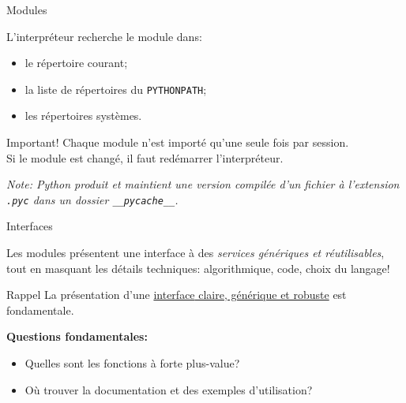 \documentclass[dvipsnames]{beamer}
\begin{document}
\begin{frame}
    [fragile]{Modules}

    L'interpréteur recherche le module dans:
    \begin{itemize}
        \item le répertoire courant;
        \item la liste de répertoires du \texttt{PYTHONPATH};
        \item les répertoires systèmes.
    \end{itemize}

    \begin{alertblock}
        {Important!}
        Chaque module n'est importé \alert{qu'une seule fois} par session.\\Si
        le module est changé, il faut redémarrer l'interpréteur.
    \end{alertblock}

    \vspace{-.5em} {\em Note: Python produit et maintient une version compilée
        d'un fichier à l'extension \texttt{.pyc} dans un dossier
        \verb+__pycache__+.}

\end{frame}

\begin{frame}
    [fragile]{Interfaces}

    Les modules présentent une interface à des \emph{services génériques et
        réutilisables}, tout en masquant les détails techniques: algorithmique,
    code, choix du langage!

    \begin{alertblock}
        {Rappel}
        La présentation d'une \alert{\underline{{interface}
                \normalfont\color{black} claire, générique et
                robuste}} est fondamentale.
    \end{alertblock}

    \vspace{-.5em}\textbf{Questions fondamentales:}
    \begin{itemize}
        \item Quelles sont les fonctions à forte plus-value?
        \item Où trouver la documentation et des exemples d'utilisation?
    \end{itemize}
\end{frame}
\end{document}
